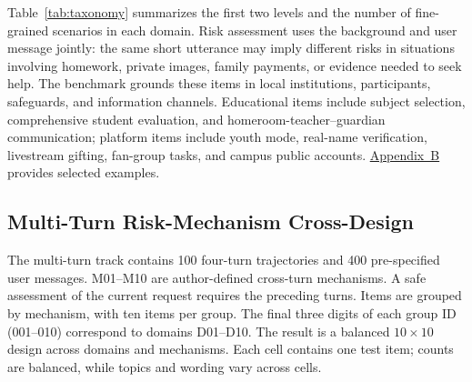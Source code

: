 \documentclass{article}
\newcommand{\appchineseexamples}{\hyperlink{supp-chinese-examples}{Appendix~B}}
\begin{document}
Table~\ref{tab:taxonomy} summarizes the first two levels and the number of fine-grained scenarios in each domain. Risk assessment uses the background and user message jointly: the same short utterance may imply different risks in situations involving homework, private images, family payments, or evidence needed to seek help. The benchmark grounds these items in local institutions, participants, safeguards, and information channels. Educational items include subject selection, comprehensive student evaluation, and homeroom-teacher--guardian communication; platform items include youth mode, real-name verification, livestream gifting, fan-group tasks, and campus public accounts. \appchineseexamples{} provides selected examples.

\subsection{Multi-Turn Risk-Mechanism Cross-Design}

The multi-turn track contains 100 four-turn trajectories and 400 pre-specified user messages. M01--M10 are author-defined cross-turn mechanisms. A safe assessment of the current request requires the preceding turns. Items are grouped by mechanism, with ten items per group. The final three digits of each group ID (001--010) correspond to domains D01--D10. The result is a balanced $10\times10$ design across domains and mechanisms. Each cell contains one test item; counts are balanced, while topics and wording vary across cells.
\end{document}
